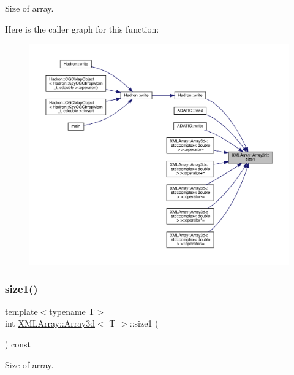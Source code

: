 Size of array. 

Here is the caller graph for this function\+:\nopagebreak
\begin{figure}[H]
\begin{center}
\leavevmode
\includegraphics[width=350pt]{db/da0/classXMLArray_1_1Array3d_aa084cbb2756e62556c9ec4c4cb971bf0_icgraph}
\end{center}
\end{figure}
\mbox{\label{classXMLArray_1_1Array3d_aa084cbb2756e62556c9ec4c4cb971bf0}} 
\subsubsection{\texorpdfstring{size1()}{size1()}\hspace{0.1cm}{\footnotesize\ttfamily [2/2]}}
{\footnotesize\ttfamily template$<$typename T$>$ \\
int \mbox{\hyperlink{classXMLArray_1_1Array3d}{X\+M\+L\+Array\+::\+Array3d}}$<$ T $>$\+::size1 (\begin{DoxyParamCaption}{ }\end{DoxyParamCaption}) const\hspace{0.3cm}{\ttfamily [inline]}}



Size of array. 

\mbox{\label{classXMLArray_1_1Array3d_a1ea00a28e916b3fd9102ce7057c02dac}} 
